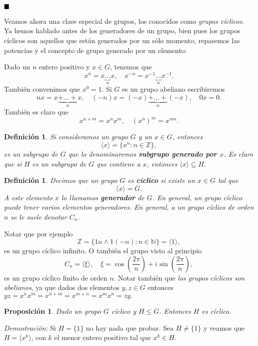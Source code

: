 \documentclass[12pt]{article}
\newtheorem{proposition}[theorem]{Proposición}
\newtheorem{definition}[theorem]{Definición}
\begin{document}
$\hfill \blacksquare$

Veamos ahora una clase especial de grupos, los conocidos como \textit{grupos cíclicos}. Ya hemos hablado antes de los generadores de un grupo, bien pues los grupos cíclicos son aquellos que están generados por un sólo momento, repasemos las potencias y el concepto de grupo generado por un elemento:

Dado un $n$ entero positivo y $x\in G$, tenemos que $$x^n = x\underbrace{\ldots}_{n} x, \quad x^{-n} = x^{-1} \underbrace{\ldots}_n x^{-1}.$$ También convenimos que $x^0 = 1$. Si $G$ es un grupo abeliano escribiremos $$nx = x\underbrace{+\ldots +}_n x, \quad (-n)x=(-x)\underbrace{+\ldots +}_n(-x), \quad 0x = 0.$$ También es claro que $$x^{n+m} = x^nx^m, \quad (x^n)^m=x^{nm}.$$

\begin{definition}Si consideramos un grupo $G$ y un $x\in G$, entonces $$\langle x \rangle = \lbrace x^n:n \in \mathbb{Z} \rbrace,$$ es un subgrupo de $G$ que lo denominaremos \textbf{subgrupo generado por $x$}. Es claro que si $H$ es un subgrupo de $G$ que contiene a $x$, entonces $\langle x \rangle \subseteq H$.
\end{definition}

\begin{definition}Decimos que un grupo $G$ es \textbf{cíclico} si existe un $x \in G$ tal que $$\langle x \rangle = G.$$ A este elemento $x$ lo llamamos \textbf{generador} de $G$. En general, un grupo cíclico puede tener varios elementos generadores. En general, a un grupo cíclico de orden $n$ se le suele denotar $C_n$.
\end{definition}

Notar que por ejemplo $$\mathbb{Z} = \lbrace 1n \wedge 1(-n) :n \in \mathbb{N} \rbrace= \langle 1 \rangle,$$ es un grupo cíclico infinito. O también el grupo visto al principio $$C_n = \langle \xi \rangle, \quad \xi = \cos\left(\dfrac{2\pi}{n}\right)+i\sin\left(\dfrac{2\pi}{n}\right),$$ es un grupo cíclico finito de orden $n$. Notar también que \textit{los grupos cíclicos son abelianos}, ya que dados dos elementos $y,z \in G$ entonces $yz = x^nx^m=x^{n+m}=x^{m+n} = x^mx^n=zy.$

\begin{proposition}\label{eq:subciclico} Dado un grupo $G$ cíclico y $H \leq G$. Entonces $H$ es cíclico.
\end{proposition}
\emph{Demostración: } Si $H = \lbrace 1 \rbrace$ no hay nada que probar. Sea $H \neq \lbrace 1 \rbrace$ y veamos que $H = \langle x^{k} \rangle$, con $k$ el menor entero positivo tal que $x^{k} \in H$.
\end{document}

